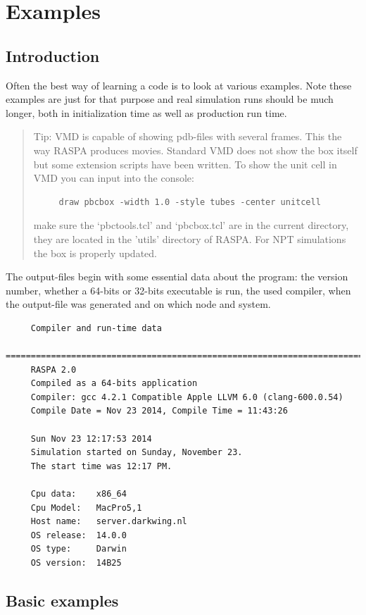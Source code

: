 \chapter{Examples\label{Examples: chapter}}

\section{Introduction}

Often the best way of learning a code is to look at various examples. Note these examples are just for that purpose
and real simulation runs should be much longer, both in initialization time as well as production run time.

\begin{quote}
Tip: VMD is capable of showing pdb-files with several frames. This the way RASPA produces movies. Standard VMD does
not show the box itself but some extension scripts have been written. To show the unit cell in VMD you can
input into the console:
\begin{verbatim}
     draw pbcbox -width 1.0 -style tubes -center unitcell
\end{verbatim}
make sure the `pbctools.tcl' and `pbcbox.tcl' are in the current directory, they are located in the 'utils' directory of RASPA.
For NPT simulations the box is properly updated.
\end{quote}

The output-files begin with some essential data about the program: the version number, whether a 64-bits or 32-bits executable is run,
the used compiler, when the output-file was generated and on which node and system.
\begin{verbatim}
     Compiler and run-time data
     ===========================================================================
     RASPA 2.0
     Compiled as a 64-bits application
     Compiler: gcc 4.2.1 Compatible Apple LLVM 6.0 (clang-600.0.54)
     Compile Date = Nov 23 2014, Compile Time = 11:43:26
     
     Sun Nov 23 12:17:53 2014
     Simulation started on Sunday, November 23.
     The start time was 12:17 PM.
     
     Cpu data:    x86_64
     Cpu Model:   MacPro5,1
     Host name:   server.darkwing.nl
     OS release:  14.0.0
     OS type:     Darwin
     OS version:  14B25
\end{verbatim}


\section{Basic examples}

